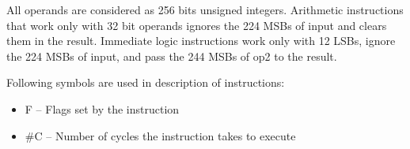 \documentclass{tropic_design_spec}
\begin{document}
All operands are considered as 256 bits unsigned integers. Arithmetic instructions that work only with 32 bit
operands ignores the 224 MSBs of input and clears them in the result. Immediate logic instructions work only
with 12 LSBs, ignore the 224 MSBs of input, and pass the 244 MSBs of op2 to the result.





Following symbols are used in description of instructions:
\begin{itemize}
    \item{F -- Flags set by the instruction}
    \item{\#C -- Number of cycles the instruction takes to execute}
\end{itemize}
\end{document}
